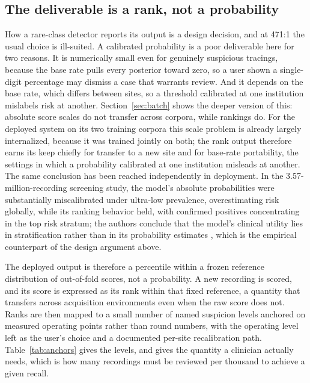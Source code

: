 \documentclass[11pt]{article}
\begin{document}
\subsection{The deliverable is a rank, not a probability}
\label{sec:deliverable}

How a rare-class detector reports its output is a design decision, and at 471:1 the usual choice is ill-suited. A calibrated probability is a poor deliverable here for two reasons. It is numerically small even for genuinely suspicious tracings, because the base rate pulls every posterior toward zero, so a user shown a single-digit percentage may dismiss a case that warrants review. And it depends on the base rate, which differs between sites, so a threshold calibrated at one institution mislabels risk at another. Section~\ref{sec:batch} shows the deeper version of this: absolute score scales do not transfer across corpora, while rankings do. For the deployed system on its two training corpora this scale problem is already largely internalized, because it was trained jointly on both; the rank output therefore earns its keep chiefly for transfer to a new site and for base-rate portability, the settings in which a probability calibrated at one institution misleads at another. The same conclusion has been reached independently in deployment. In the 3.57-million-recording screening study, the model's absolute probabilities were substantially miscalibrated under ultra-low prevalence, overestimating risk globally, while its ranking behavior held, with confirmed positives concentrating in the top risk stratum; the authors conclude that the model's clinical utility lies in stratification rather than in its probability estimates \cite{huang}, which is the empirical counterpart of the design argument above.

The deployed output is therefore a percentile within a frozen reference distribution of out-of-fold scores, not a probability. A new recording is scored, and its score is expressed as its rank within that fixed reference, a quantity that transfers across acquisition environments even when the raw score does not. Ranks are then mapped to a small number of named suspicion levels anchored on measured operating points rather than round numbers, with the operating level left as the user's choice and a documented per-site recalibration path. Table~\ref{tab:anchors} gives the levels, and gives the quantity a clinician actually needs, which is how many recordings must be reviewed per thousand to achieve a given recall.
\end{document}
